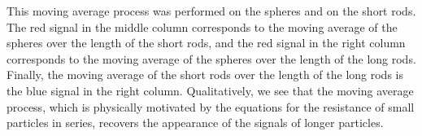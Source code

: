 		This moving average process was performed on the spheres and on the short rods. The red signal in the middle column corresponds to the moving average of the spheres over the length of the short rods, and the red signal in the right column corresponds to the moving average of the spheres over the length of the long rods. Finally, the moving average of the short rods over the length of the long rods is the blue signal in the right column. Qualitatively, we see that the moving average process, which is physically motivated by the equations for the resistance of small particles in series, recovers the appearance of the signals of longer particles. 
		
	
	
		
		
		
	

	




